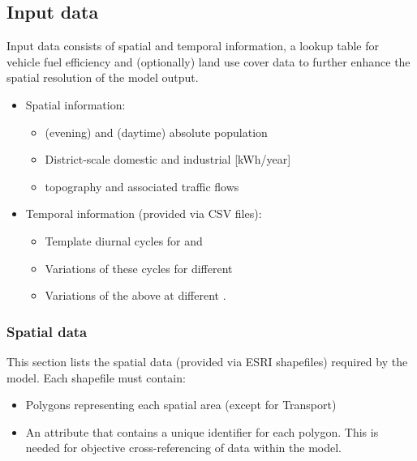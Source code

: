 \documentclass[letterpaper,10pt,english]{sphinxmanual}
\begin{document}
\subsection{Input data}
\label{\detokenize{OtherManuals/GQF_Manual:input-data}}
Input data consists of spatial and temporal information, a lookup table
for vehicle fuel efficiency and (optionally) land use cover data to
further enhance the spatial resolution of the model output.
\begin{itemize}
\item {} 
Spatial information:
\begin{itemize}
\item {} 
 (evening) and  (daytime) absolute
population

\item {} 
District-scale domestic and industrial 
{[}kWh/year{]}

\item {} 
 topography and associated traffic flows

\end{itemize}

\item {} 
Temporal information (provided via CSV files):
\begin{itemize}
\item {} 
Template diurnal cycles for 
and 

\item {} 
Variations of these cycles for different 

\item {} 
Variations of the above at different .

\end{itemize}

\end{itemize}


\subsubsection{Spatial data}
\label{\detokenize{OtherManuals/GQF_Manual:spatial-data}}
This section lists the spatial data (provided via ESRI shapefiles)
required by the model. Each shapefile must contain:
\begin{itemize}
\item {} 
Polygons representing each spatial area (except for Transport)

\item {} 
An attribute that contains a unique identifier for each polygon. This
is needed for objective cross-referencing of data within the model.

\end{itemize}
\end{document}
